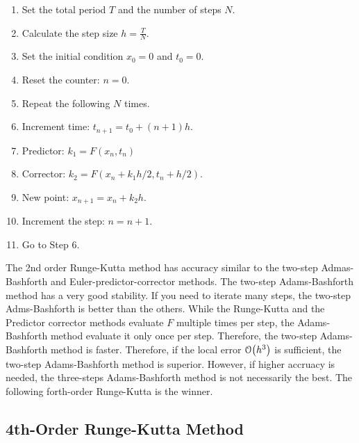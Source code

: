 \bigskip
\begin{myalgobox}
	\label{algo:runge-kutta2}

	\medskip	
	\begin{minipage}{5.5in}
		\begin{enumerate}
			\item Set the total period $T$ and the number of steps $N$.
			\item Calculate the step size $h=\displaystyle\frac{T}{N}$.
			\item Set the initial condition $x_0=0$ and $t_0=0$.
			\item Reset the counter: $n=0$.
			\item Repeat the following $N$ times.
			\item Increment time: $t_{n+1}=t_0 + (n+1)h$.
			\item Predictor: $k_1 = F(x_n,t_n)$						
			\item Corrector: $k_2 = F(x_n+k_1 h/2,t_{n}+h/2) $.
			\item New point: $x_{n+1}=x_n + k_2 h$.
			\item Increment the step: $n=n+1$.
			\item Go to Step 6.
		\end{enumerate}
	\end{minipage}
\end{myalgobox}

\bigskip

The 2nd order Runge-Kutta method has accuracy similar to the two-step Admas-Bashforth and Euler-predictor-corrector methods.
The two-step Adams-Bashforth method has a very good stability. If you need to iterate many steps, the two-step Adms-Bashforth is better than the others.
While the Runge-Kutta and the Predictor corrector methods evaluate $F$ multiple times per step, the Adams-Bashforth method evaluate it only once per step.  Therefore, the two-step Adams-Bashforth method is faster.  Therefore, if the local error $\order{h^3}$ is sufficient, the two-step Adams-Bashforth method is superior.  However, if higher accruacy is needed, the three-steps Adams-Bashforth method is not necessarily the best. The following forth-order Runge-Kutta is the winner.


\noindent
\subsection{4th-Order Runge-Kutta Method}

